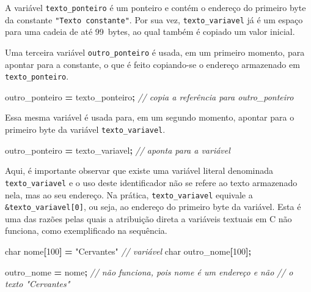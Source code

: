 \documentclass[
  11pt,
  a4paper,
]{scrbook}
\newenvironment{Shaded}{\begin{snugshade}}{\end{snugshade}}
\newcommand{\CommentTok}[1]{\textcolor[rgb]{0.56,0.35,0.01}{\textit{#1}}}
\newcommand{\DataTypeTok}[1]{\textcolor[rgb]{0.13,0.29,0.53}{#1}}
\newcommand{\DecValTok}[1]{\textcolor[rgb]{0.00,0.00,0.81}{#1}}
\newcommand{\NormalTok}[1]{#1}
\newcommand{\OperatorTok}[1]{\textcolor[rgb]{0.81,0.36,0.00}{\textbf{#1}}}
\newcommand{\StringTok}[1]{\textcolor[rgb]{0.31,0.60,0.02}{#1}}
\begin{document}
A variável \texttt{texto\_ponteiro} é um ponteiro e contém o endereço do
primeiro byte da constante \texttt{"Texto\ constante"}. Por sua vez,
\texttt{texto\_variavel} já é um espaço para uma cadeia de até 99~bytes,
ao qual também é copiado um valor inicial.

Uma terceira variável \texttt{outro\_ponteiro} é usada, em um primeiro
momento, para apontar para a constante, o que é feito copiando-se o
endereço armazenado em \texttt{texto\_ponteiro}.

\begin{Shaded}
\begin{Highlighting}[]
\NormalTok{outro\_ponteiro }\OperatorTok{=}\NormalTok{ texto\_ponteiro}\OperatorTok{;}  \CommentTok{// copia a referência para outro\_ponteiro}
\end{Highlighting}
\end{Shaded}

Essa mesma variável é usada para, em um segundo momento, apontar para o
primeiro byte da variável \texttt{texto\_variavel}.

\begin{Shaded}
\begin{Highlighting}[]
\NormalTok{outro\_ponteiro }\OperatorTok{=}\NormalTok{ texto\_variavel}\OperatorTok{;}  \CommentTok{// aponta para a variável}
\end{Highlighting}
\end{Shaded}

Aqui, é importante observar que existe uma variável literal denominada
\texttt{texto\_variavel} e o uso deste identificador não se refere ao
texto armazenado nela, mas ao seu endereço. Na prática,
\texttt{texto\_variavel} equivale a \texttt{\&texto\_variavel{[}0{]}},
ou seja, ao endereço do primeiro byte da variável. Esta é uma das razões
pelas quais a atribuição direta a variáveis textuais em C não funciona,
como exemplificado na sequência.

\begin{Shaded}
\begin{Highlighting}[]
\DataTypeTok{char}\NormalTok{ nome}\OperatorTok{[}\DecValTok{100}\OperatorTok{]} \OperatorTok{=} \StringTok{"Cervantes"}  \CommentTok{// variável }
\DataTypeTok{char}\NormalTok{ outro\_nome}\OperatorTok{[}\DecValTok{100}\OperatorTok{];}

\NormalTok{outro\_nome }\OperatorTok{=}\NormalTok{ nome}\OperatorTok{;}  \CommentTok{// não funciona, pois \textquotesingle{}nome\textquotesingle{} é um endereço e não}
                    \CommentTok{// o texto "Cervantes"}
\end{Highlighting}
\end{Shaded}
\end{document}

